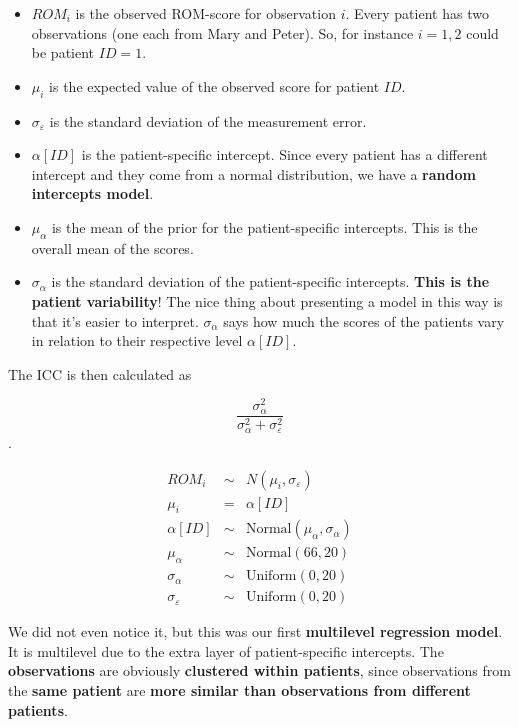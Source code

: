\documentclass[
]{book}
\providecommand{\tightlist}{%
  \setlength{\itemsep}{0pt}\setlength{\parskip}{0pt}}
\begin{document}
\begin{itemize}
\tightlist
\item
  \(ROM_i\) is the observed ROM-score for observation \(i\).
  Every patient has two observations (one each from Mary and Peter).
  So, for instance \(i=1,2\) could be patient \(ID=1\).
\item
  \(\mu_i\) is the expected value of the observed score for patient \(ID\).
\item
  \(\sigma_{\varepsilon}\) is the standard deviation of the measurement error.
\item
  \(\alpha[ID]\) is the patient-specific intercept.
  Since every patient has a different intercept and they
  come from a normal distribution, we have a \textbf{random intercepts model}.
\item
  \(\mu_{\alpha}\) is the mean of the prior for the patient-specific intercepts.
  This is the overall mean of the scores.
\item
  \(\sigma_{\alpha}\) is the standard deviation of the patient-specific intercepts.
  \textbf{This is the patient variability}! The nice thing about presenting a model in this
  way is that it's easier to interpret. \(\sigma_{\alpha}\) says how much
  the scores of the patients vary in relation to their respective level \(\alpha[ID]\).
\end{itemize}

The ICC is then calculated as

\[\frac{\sigma_{\alpha}^2}{\sigma_{\alpha}^2 + \sigma_{\varepsilon}^2}\].

\[
\begin{array}{rcl}
ROM_i &\sim& N(\mu_i, \sigma_{\varepsilon}) \\
\mu_i &=& \alpha[ID] \\
\alpha[ID] &\sim& \text{Normal}(\mu_{\alpha}, \sigma_{\alpha}) \\
\mu_{\alpha} &\sim& \text{Normal}(66, 20) \\
\sigma_{\alpha} &\sim& \text{Uniform}(0,20) \\
\sigma_{\varepsilon} &\sim& \text{Uniform}(0,20)
\end{array}
\]

We did not even notice it, but this was our first \textbf{multilevel regression model}.
It is multilevel due to the extra layer of patient-specific intercepts.
The \textbf{observations} are obviously \textbf{clustered within patients}, since observations
from the \textbf{same patient} are \textbf{more similar than observations from different patients}.
\end{document}
